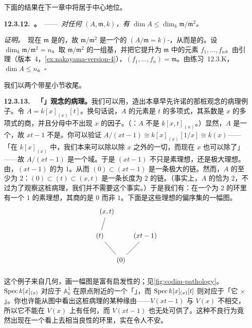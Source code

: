 下面的结果在下一章中将居于中心地位。

\textbf{12.3.12.\ \trhTheorem{}。}\ ——\ \emph{对任何\trNoetherian\trLocalRing{} $(A,\mathfrak{m},k)$，有 $\dim A\le\dim_k\mathfrak{m}/\mathfrak{m}^2$。}

\emph{证明。}\ 现在 $\mathfrak{m}$ 是\trFinitelyGenerated{}的，故 $\mathfrak{m}/\mathfrak{m}^2$ 是一个\trFinitelyGenerated{}的 $(A/\mathfrak{m}=k)$-\trModule，从而是\trFiniteDimensional{}的。设 $\dim_k\mathfrak{m}/\mathfrak{m}^2=n$。取 $\mathfrak{m}/\mathfrak{m}^2$ 的一组基，并把它提升为 $\mathfrak{m}$ 中的元素 $f_1,\dots,f_n$。由\trNakayama{}引理（版本~4，\cref{ex:nakayama-version-4}），$(f_1,\dots,f_n)=\mathfrak{m}$。由\mbox{练习~12.3.K}，$\dim A\le n$。\hfill$\square$

我们以两个带星小节收尾。

\textbf{12.3.13.}\ \hard\ \textbf{「\trCodimension」观念的病理。}\quad 我们可以用\trKrull{}\trPrincipalIdealTheorem，造出本章早先许诺的那桩\trCodimension{}观念的病理例子。令 $A=k[x]_{(x)}[t]$。换句话说，$A$ 的元素是 $t$ 的多项式，其系数是 $x$ 的多项式的商，并且分母中不出现 $x$ 的因子。（\trhWarning{}：$A$ 不是 $k[x,t]_{(x)}$。）显然，$A$ 是一个\trIntegralDomain，故 $xt-1$ 不是\trZerodivisor。你可以验证 $A/(xt-1)\cong k[x]_{(x)}[1/x]\cong k(x)$——「在 $k[x]_{(x)}$ 中，我们本来可以除以除 $x$ 之外的一切，而现在 $x$ 也可以除了」——故 $A/(xt-1)$ 是一个域。于是 $(xt-1)$ 不只是素理想，还是极大理想。由\trKrull{}\trPrincipalIdealTheorem，$(xt-1)$ 的\trCodimension{}为 $1$。从而 $(0)\subset(xt-1)$ 是一条极大的链。然而，$A$ 的\trDimension{}至少为 $2$：$(0)\subset(t)\subset(x,t)$ 是一条长度为 $2$ 的\trPrimeIdeal{}链。（事实上，$A$ 的\trDimension{}恰为 $2$，不过为了观察这桩病理，我们并不需要这个事实。）于是我们有：在一个\trDimension{}为 $2$ 的环里有一个\trCodimension{} $1$ 的素理想，其商的\trDimension{}是 $0$ 而非 $1$。下面是这些理想的偏序集的一幅图。
\[
\begin{tikzpicture}[scale=1.05]
  \node (xt) at (0.2,2.2) {$(x,t)$};
  \node (t) at (-0.15,1.0) {$(t)$};
  \node (xt1) at (2.1,1.0) {$(xt-1)$};
  \node (zer) at (0.9,-0.2) {$(0)$};
  \draw (xt) -- (t);
  \draw (t) -- (zer);
  \draw (xt1) -- (zer);
\end{tikzpicture}
\]

这个例子来自几何，画一幅图是富有启发性的；见\cref{fig:codim-pathology}。$\operatorname{Spec} k[x]_{(x)}$ 对应于 $\mathbb{A}^1_k$ 在原点附近的一个「\trGerm」，而 $\operatorname{Spec} k[x]_{(x)}[t]$ 则对应于「它 $\times$ \trAffineLine」。你也许能从图中看出这桩病理的某种缘由——$V(xt-1)$ 与 $V(x)$ 不相交，所以它不能在 $V(x)$ 上有任何\trSpecialization，而 $V(xt-1)$ 也无处可供\trSpecialization{}了。这种不良行为竟然出现在一个看上去相当良性的环里，实在令人不安。

